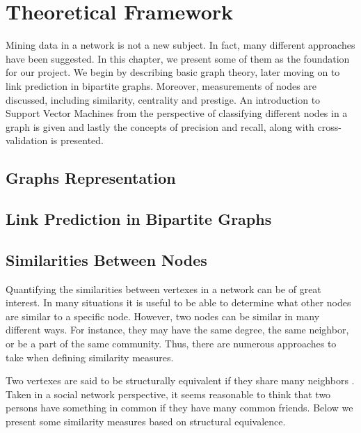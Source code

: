 \chapter{Theoretical Framework}
Mining data in a network is not a new subject. In fact, many different approaches have been suggested. In this chapter, we present some of them as the foundation for our project. We begin by describing basic graph theory, later moving on to link prediction in bipartite graphs. Moreover, measurements of nodes are discussed, including similarity, centrality and prestige. An introduction to Support Vector Machines from the perspective of classifying different nodes in a graph is given and lastly the concepts of precision and recall, along with cross-validation is presented.

\section{Graphs Representation}


\section{Link Prediction in Bipartite Graphs}


\section{Similarities Between Nodes \label{sim}}
Quantifying the similarities between vertexes in a network can be of great interest. In many situations it is useful to be able to determine what other nodes are similar to a specific node. However, two nodes can be similar in many different ways. For instance, they may have the same degree, the same neighbor, or be a part of the same community. Thus, there are numerous approaches to take when defining similarity measures.

Two vertexes are said to be structurally equivalent if they share many neighbors \cite{leicht2006}. Taken in a social network perspective, it seems reasonable to think that two persons have something in common if they have many common friends. Below we present some similarity measures based on structural equivalence.

